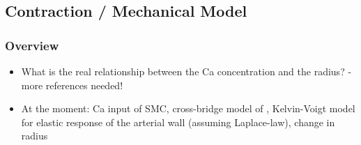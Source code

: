 \subsection{Contraction / Mechanical Model}
\subsubsection{Overview}


\begin{itemize}
\item What is the real relationship between the Ca concentration and the radius? - more references needed!
\item At the moment: Ca input of SMC, cross-bridge model of \citet{HaiMurphy}, Kelvin-Voigt model for elastic response of the arterial wall (assuming Laplace-law), change in radius 
\end{itemize}

